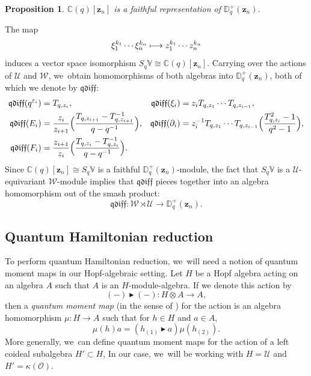 \documentclass[JEP,XML,SOM,Unicode,published]{cedram}
\let\epsilon\varepsilon
\newcommand\mto{\mathchoice{\longmapsto}{\mapsto}{\mapsto}{\mapsto}}
\newtheorem{prop}[thm]{Proposition}
\theoremstyle{definition}
\newcommand{\CC}{\mathbb{C}}
\newcommand{\OO}{\mathcal{O}}
\newcommand{\UU}{\mathcal{U}}
\newcommand{\WW}{\mathcal{W}}
\begin{document}
\begin{prop}
$\CC(q)[\boldsymbol{z}_n]$ is a faithful representation of $\mathbb{D}_q^+(\boldsymbol{z}_n)$.
\end{prop}

The map
\[
\xi_1^{k_1}\cdots \xi_n^{k_n}\mto z_1^{k_1}\cdots z_n^{k_n}
\]
induces a vector space isomorphism $S_q\mathbb{V}\cong\CC(q)[\boldsymbol{z}_n]$.
Carrying over the actions of $\UU$ and $\WW$, we~obtain homomorphisms of both algebras into $\mathbb{D}_q^+(\boldsymbol{z}_n)$, both of which we denote by $\mathfrak{qdiff}$:
\begin{equation}
\begin{aligned}
\mathfrak{qdiff}(q^{\epsilon_i})&= T_{q,z_i},&
\mathfrak{qdiff}(\xi_i)&=z_i T_{q, z_1}\cdots T_{q,z_{i-1}},\\
\mathfrak{qdiff}(E_i)&= \frac{z_{i}}{z_{i+1}}\Bigl(\frac{T_{q,z_{i+1}}-T_{q, z_{i+1}}^{-1}}{q-q^{-1}} \Bigr),&
\mathfrak{qdiff}(\partial_i)&= z_i^{-1}T_{q,z_1}\cdots T_{q,z_{i-1}}\Bigl(\frac{T_{q,z_i}^2-1}{q^2-1} \Bigr),\\
\mathfrak{qdiff}(F_i)&= \frac{z_{i+1}}{z_i}\Bigl(\frac{T_{q,z_i}-T_{q, z_i}^{-1}}{q-q^{-1}} \Bigr).
\end{aligned}
\label{QDiffMap}
\end{equation}
Since $\CC(q)[\boldsymbol{z}_n]\cong S_q\mathbb{V}$ is a faithful $\mathbb{D}^+_q(\boldsymbol{z}_n)$-module, the fact that $S_q\mathbb{V}$ is a $\UU$-equivariant $\WW$-module implies that $\mathfrak{qdiff}$ pieces together into an algebra homomorphism out of the smash product:
\[
\mathfrak{qdiff}:\WW\rtimes\UU\to\mathbb{D}^+_q(\boldsymbol{z}_n).
\]

\subsection{Quantum Hamiltonian reduction}
To perform quantum Hamiltonian reduction, we~will need a notion of quantum moment maps in our Hopf-algebraic setting.
Let $H$ be a Hopf algebra acting on an algebra $A$ such that $A$ is an $H$-module-algebra.
If we denote this action by
\[
(-)\blacktriangleright(-):H\otimes A\to A,
\]
then a \textit{quantum moment map} (in the sense of \cite{VarVassRoot}) for the action is an algebra homomorphism $\mu:H\to A$ such that for $h\in H$ and $a\in A$,
\begin{equation}
\mu(h)a=(h_{(1)}\blacktriangleright a)\mu(h_{(2)}).
\label{QMMDef}
\end{equation}
More generally, we~can define quantum moment maps for the action of a left coideal subalgebra $H'\subset H$,
In our case, we~will be working with $H=\UU$ and $H'=\kappa(\OO)$.
\end{document}
